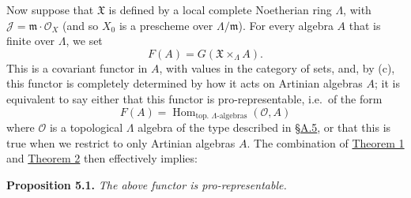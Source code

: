 \documentclass{article}
\newenvironment{itenv}[1]
  {\phantomsection\par\smallskip\noindent\textbf{#1.}\itshape}
  {\par\smallskip}
\newcommand{\oldpage}[1]{\marginpar{\footnotesize$\Big\vert$ \textit{p.~#1}}}
\theoremstyle{definition}
\theoremstyle{definition}
\theoremstyle{definition}
\theoremstyle{definition}
\theoremstyle{remark}
\begin{document}
Now suppose that \({\mathfrak{X}}\) is defined by a local complete Noetherian ring \(\Lambda\), with \({\mathscr{J}}={\mathfrak{m}}\cdot{\mathscr{O}}_X\) (and so \(X_0\) is a prescheme over \(\Lambda/{\mathfrak{m}}\)).
For every algebra \(A\) that is finite over \(\Lambda\), we set
\[
  F(A) = G({\mathfrak{X}}\times_\Lambda A).
\]
This is a covariant functor in \(A\), with values in the category of sets, and, by (c), this functor is completely determined by how it acts on Artinian algebras \(A\);
it is equivalent to say either that this functor is pro-representable, i.e.~of the form
\[
  F(A) = \operatorname{Hom}_{\text{top. }\Lambda\text{-algebras}}({\mathscr{O}},A)
\]
\oldpage{195-21}where \({\mathscr{O}}\) is a topological \(\Lambda\) algebra of the type described in \protect\hyperlink{fga-3-ii-section-A.5}{§A.5}, or that this is true when we restrict to only Artinian algebras \(A\).
The combination of \protect\hyperlink{fga-3-ii-section-B-theorem-1}{Theorem 1} and \protect\hyperlink{fga-3-ii-section-B-theorem-2}{Theorem 2} then effectively implies:

\leavevmode{}%
\begin{itenv}{Proposition 5.1}
The above functor is pro-representable.

\end{itenv}
\end{document}
